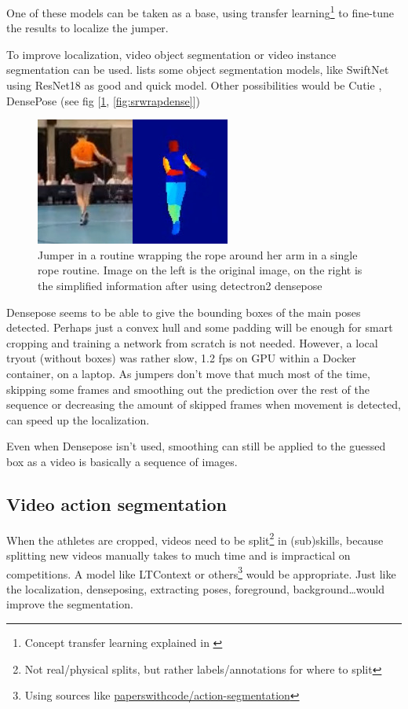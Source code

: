 One of these models can be taken as a base, using transfer learning\footnote{Concept transfer learning explained in \autocite{Bharadiya_2023}} to fine-tune the results to localize the jumper.

To improve localization, video object segmentation or video instance segmentation can be used. \textcite{Gao_2022} lists some object segmentation models, like SwiftNet \textcite{Wang_2021} using ResNet18 as good and quick model.
Other possibilities would be Cutie \autocite{Cheng_2023}, DensePose (see fig [\ref{fig:srwrap}, \ref{fig:srwrapdense}]) \autocite{Guler_2018}

\begin{figure}
    \centering
    \includegraphics[width=0.3\linewidth]{../graphics/sr-denseposed}
    \caption{Jumper in a routine wrapping the rope around her arm in a single rope routine. Image on the left is the original image, on the right is the simplified information after using detectron2 densepose \autocite{wu2019detectron2}}
    \label{fig:srwrap}
\end{figure}

Densepose seems to be able to give the bounding boxes of the main poses detected. Perhaps just a convex hull and some padding will be enough for smart cropping and training a network from scratch is not needed.
However, a local tryout (without boxes) was rather slow, 1.2 fps on GPU within a Docker container, on a laptop.
As jumpers don’t move that much most of the time, skipping some frames and smoothing out the prediction over the rest of the sequence or decreasing the amount of skipped frames when movement is detected, can speed up the localization.

Even when Densepose isn’t used, smoothing can still be applied to the guessed box as a video is basically a sequence of images.

\subsection{Video action segmentation}

When the athletes are cropped, videos need to be split\footnote{Not real/physical splits, but rather labels/annotations for where to split} in (sub)skills, because splitting new videos manually takes to much time and is impractical on competitions. A model like LTContext \textcite{Jiaming_2023} or others\footnote{Using sources like \href{https://paperswithcode.com/task/action-segmentation}{paperswithcode/action-segmentation}} would be appropriate.
Just like the localization, denseposing, extracting poses, foreground, background\dots would improve the segmentation.

